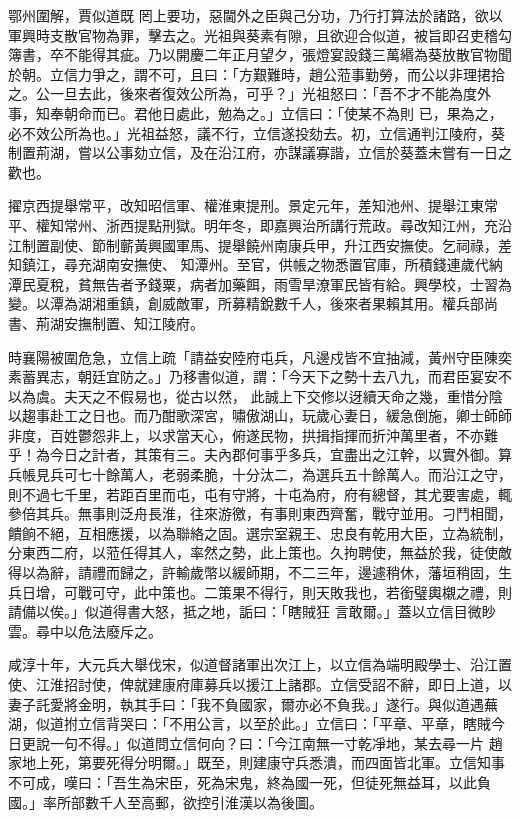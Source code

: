\begin{pinyinscope}
 鄂州圍解，賈似道既
 罔上要功，惡閫外之臣與己分功，乃行打算法於諸路，欲以軍興時支散官物為罪，擊去之。光祖與葵素有隙，且欲迎合似道，被旨即召吏稽勾簿書，卒不能得其疵。乃以開慶二年正月望夕，張燈宴設錢三萬緡為葵放散官物聞於朝。立信力爭之，謂不可，且曰：「方艱難時，趙公蒞事勤勞，而公以非理捃拾之。公一旦去此，後來者復效公所為，可乎？」光祖怒曰：「吾不才不能為度外事，知奉朝命而已。君他日處此，勉為之。」立信曰：「使某不為則
 已，果為之，必不效公所為也。」光祖益怒，議不行，立信遂投劾去。初，立信通判江陵府，葵制置荊湖，嘗以公事劾立信，及在沿江府，亦謀議寡諧，立信於葵蓋未嘗有一日之歡也。



 擢京西提舉常平，改知昭信軍、權淮東提刑。景定元年，差知池州、提舉江東常平、權知常州、浙西提點刑獄。明年冬，即嘉興治所講行荒政。尋改知江州，充沿江制置副使、節制蘄黃興國軍馬、提舉饒州南康兵甲，升江西安撫使。乞祠祿，差知鎮江，尋充湖南安撫使、
 知潭州。至官，供帳之物悉置官庫，所積錢連歲代納潭民夏稅，貧無告者予錢粟，病者加藥餌，雨雪旱潦軍民皆有給。興學校，士習為變。以潭為湖湘重鎮，創威敵軍，所募精銳數千人，後來者果賴其用。權兵部尚書、荊湖安撫制置、知江陵府。



 時襄陽被圍危急，立信上疏「請益安陸府屯兵，凡邊戍皆不宜抽減，黃州守臣陳奕素蓄異志，朝廷宜防之。」乃移書似道，謂：「今天下之勢十去八九，而君臣宴安不以為虞。夫天之不假易也，從古以然，
 此誠上下交修以迓續天命之幾，重惜分陰以趨事赴工之日也。而乃酣歌深宮，嘯傲湖山，玩歲心妻日，緩急倒施，卿士師師非度，百姓鬱怨非上，以求當天心，俯遂民物，拱揖指揮而折沖萬里者，不亦難乎！為今日之計者，其策有三。夫內郡何事乎多兵，宜盡出之江幹，以實外御。算兵帳見兵可七十餘萬人，老弱柔脆，十分汰二，為選兵五十餘萬人。而沿江之守，則不過七千里，若距百里而屯，屯有守將，十屯為府，府有總督，其尤要害處，輒
 參倍其兵。無事則泛舟長淮，往來游徼，有事則東西齊奮，戰守並用。刁鬥相聞，饋餉不絕，互相應援，以為聯絡之固。選宗室親王、忠良有乾用大臣，立為統制，分東西二府，以蒞任得其人，率然之勢，此上策也。久拘聘使，無益於我，徒使敵得以為辭，請禮而歸之，許輸歲幣以緩師期，不二三年，邊遽稍休，藩垣稍固，生兵日增，可戰可守，此中策也。二策果不得行，則天敗我也，若銜璧輿櫬之禮，則請備以俟。」似道得書大怒，抵之地，詬曰：「瞎賊狂
 言敢爾。」蓋以立信目微眇雲。尋中以危法廢斥之。



 咸淳十年，大元兵大舉伐宋，似道督諸軍出次江上，以立信為端明殿學士、沿江置使、江淮招討使，俾就建康府庫募兵以援江上諸郡。立信受詔不辭，即日上道，以妻子託愛將金明，執其手曰：「我不負國家，爾亦必不負我。」遂行。與似道遇蕪湖，似道拊立信背哭曰：「不用公言，以至於此。」立信曰：「平章、平章，瞎賊今日更說一句不得。」似道問立信何向？曰：「今江南無一寸乾凈地，某去尋一片
 趙家地上死，第要死得分明爾。」既至，則建康守兵悉潰，而四面皆北軍。立信知事不可成，嘆曰：「吾生為宋臣，死為宋鬼，終為國一死，但徒死無益耳，以此負國。」率所部數千人至高郵，欲控引淮漢以為後圖。




\end{pinyinscope}
